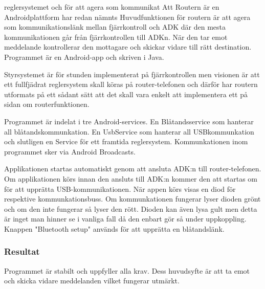 
reglersystemet och för att agera som kommunikat Att Routern är en Androidplattform har
redan nämnts Huvudfunktionen för routern är att agera som kommunikationslänk mellan fjärrkontroll och ADK där den mesta kommunikationen går från fjärrkontrollen
till ADKn.
När den tar emot meddelande kontrollerar den mottagare och skickar vidare till rätt destination. 
Programmet är en Android-app och skriven i Java.

Styrsystemet är för stunden implementerat på fjärrkontrollen men visionen är att ett fullfjädrat reglersystem skall 
köras på router-telefonen och därför har routern utformats på ett sådant sätt att det skall vara enkelt att 
implementera ett på sidan om routerfunktionen.

Programmet är indelat i tre Android-services. En Blåtandsservice som hanterar all blåtandskommunkation. 
En UsbService som hanterar all USBkommunkation och slutligen en Service för ett framtida reglersystem.
Kommunkationen inom programmet sker via Android Broadcasts.

Applikationen startas automatiskt genom att ansluta ADK:n till router-telefonen. 
Om applikationen körs innan den ansluts till ADK:n kommer den att startas om för att upprätta USB-kommunikationen. 
När appen körs visas en diod för respektive kommunkationsbuss. Om kommunkationen fungerar lyser dioden grönt och om 
den inte fungerar så lyser den rött. Dioden kan även lysa gult men detta är inget man hinner se i vanliga fall då 
den enbart gör så under uppkoppling. Knappen "Bluetooth setup" används för att upprätta en blåtandslänk.


\subsubsection{Resultat}
Programmet är stabilt och uppfyller alla krav. Dess huvudsyfte är att ta emot och skicka vidare meddelanden 
vilket fungerar utmärkt.